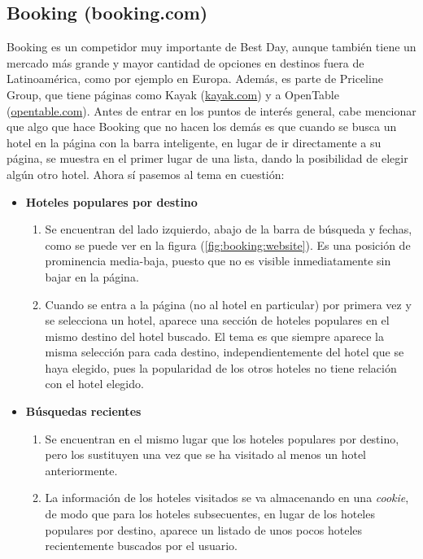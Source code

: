 \documentclass[12pt]{report}
\begin{document}
\subsection*{Booking (booking.com)}

Booking es un competidor muy importante de Best Day, aunque también tiene un mercado más grande y mayor cantidad de opciones en destinos fuera de Latinoamérica, como por ejemplo en Europa. Además, es parte de Priceline Group, que tiene páginas como Kayak (\url{kayak.com}) y a OpenTable (\url{opentable.com}). Antes de entrar en los puntos de interés general, cabe mencionar que algo que hace Booking que no hacen los demás es que cuando se busca un hotel en la página con la barra inteligente, en lugar de ir directamente a su página, se muestra en el primer lugar de una lista, dando la posibilidad de elegir algún otro hotel. Ahora sí pasemos al tema en cuestión:
\begin{itemize}
	\item \textbf{Hoteles populares por destino}
	\begin{enumerate}
		\item Se encuentran del lado izquierdo, abajo de la barra de búsqueda y fechas, como se puede ver en la figura (\ref{fig:booking:website}). Es una posición de prominencia media-baja, puesto que no es visible inmediatamente sin bajar en la página.
		\item Cuando se entra a la página (no al hotel en particular) por primera vez y se selecciona un hotel, aparece una sección de hoteles populares en el mismo destino del hotel buscado. El tema es que siempre aparece la misma selección para cada destino, independientemente del hotel que se haya elegido, pues la popularidad de los otros hoteles no tiene relación con el hotel elegido.
	\end{enumerate}
	\item \textbf{Búsquedas recientes}
	\begin{enumerate}
		\item Se encuentran en el mismo lugar que los hoteles populares por destino, pero los sustituyen una vez que se ha visitado al menos un hotel anteriormente.
		\item La información de los hoteles visitados se va almacenando en una \emph{cookie}, de modo que para los hoteles subsecuentes, en lugar de los hoteles populares por destino, aparece un listado de unos pocos hoteles recientemente buscados por el usuario.
	\end{enumerate}
\end{itemize}
\end{document}
